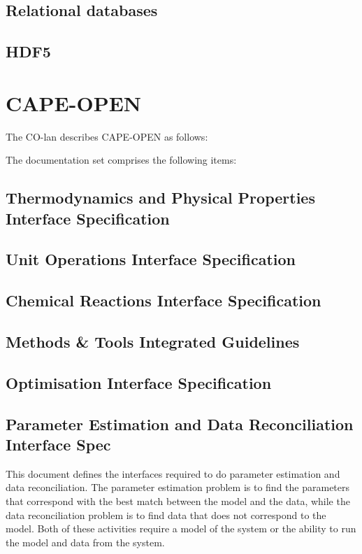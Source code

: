 \subsection{Relational databases}
\subsection{HDF5}

\section{CAPE-OPEN}
The CO-lan describes CAPE-OPEN as follows:

The documentation set comprises the following items:
\subsection{Thermodynamics and Physical Properties Interface Specification}

\subsection{Unit Operations Interface Specification}

\subsection{Chemical Reactions Interface Specification}

\subsection{Methods \& Tools Integrated Guidelines}

\subsection{Optimisation Interface Specification}

\subsection{Parameter Estimation and Data Reconciliation Interface Spec}
This document defines the interfaces required to do parameter estimation and data reconciliation.  
The parameter estimation problem is to find the parameters that correspond with the best match between the model and the data, while the data reconciliation problem is to find data that does not correspond to the model.  Both of these activities require a model of the system or the ability to run the model and data from the system.  


